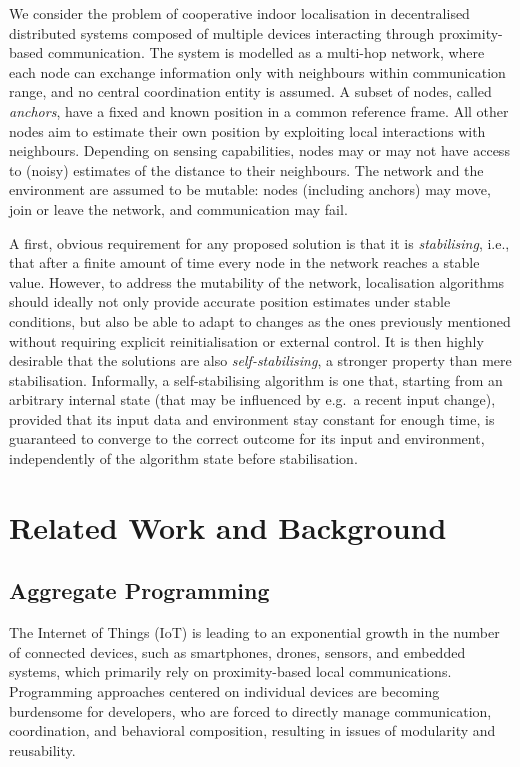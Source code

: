 \documentclass[runningheads]{llncs}
\begin{document}
We consider the problem of cooperative indoor localisation in decentralised distributed systems composed of multiple devices interacting through proximity-based communication. The system is modelled as a multi-hop network, where each node can exchange information only with neighbours within communication range, and no central coordination entity is assumed.
A subset of nodes, called \emph{anchors}, have a fixed and known position in a common reference frame. All other nodes aim to estimate their own position by exploiting local interactions with neighbours. Depending on sensing capabilities, nodes may or may not have access to (noisy) estimates of the distance to their neighbours.
%
The network and the environment are assumed to be mutable: nodes (including anchors) may move, join or leave the network, and communication may fail.

A first, obvious requirement for any proposed solution is that it is \emph{stabilising}, i.e., that after a finite amount of time every node in the network reaches a stable value. However, to address the mutability of the network, localisation algorithms should ideally not only provide accurate position estimates under stable conditions, but also be able to adapt to changes as the ones previously mentioned without requiring explicit reinitialisation or external control.
It is then highly desirable that the solutions are also \emph{self-stabilising}, a stronger property than mere stabilisation. Informally, a self-stabilising algorithm is one that, starting from an arbitrary internal state (that may be influenced by e.g.~a recent input change), provided that its input data and environment stay constant for enough time, is guaranteed to converge to the correct outcome for its input and environment, independently of the algorithm state before stabilisation.

\section{Related Work and Background} \label{sec:background}

\subsection{Aggregate Programming}\label{sec:ap}
The Internet of Things (IoT) is leading to an exponential growth in the number of connected devices, such as smartphones, drones, sensors, and embedded systems, which primarily rely on proximity-based local communications. Programming approaches centered on individual devices are becoming burdensome for developers, who are forced to directly manage communication, coordination, and behavioral composition, resulting in issues of modularity and reusability.
\end{document}
